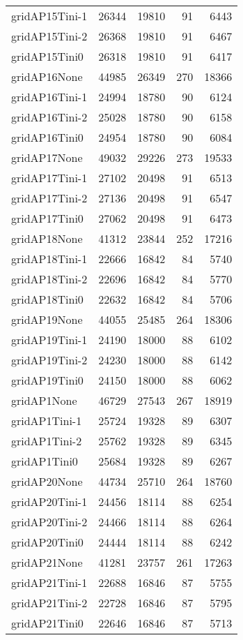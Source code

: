 \begin{longtable}{lrrrr}
gridAP15Tini-1 & 26344 & 19810 & 91 & 6443 \\
gridAP15Tini-2 & 26368 & 19810 & 91 & 6467 \\
gridAP15Tini0 & 26318 & 19810 & 91 & 6417 \\
gridAP16None & 44985 & 26349 & 270 & 18366 \\
gridAP16Tini-1 & 24994 & 18780 & 90 & 6124 \\
gridAP16Tini-2 & 25028 & 18780 & 90 & 6158 \\
gridAP16Tini0 & 24954 & 18780 & 90 & 6084 \\
gridAP17None & 49032 & 29226 & 273 & 19533 \\
gridAP17Tini-1 & 27102 & 20498 & 91 & 6513 \\
gridAP17Tini-2 & 27136 & 20498 & 91 & 6547 \\
gridAP17Tini0 & 27062 & 20498 & 91 & 6473 \\
gridAP18None & 41312 & 23844 & 252 & 17216 \\
gridAP18Tini-1 & 22666 & 16842 & 84 & 5740 \\
gridAP18Tini-2 & 22696 & 16842 & 84 & 5770 \\
gridAP18Tini0 & 22632 & 16842 & 84 & 5706 \\
gridAP19None & 44055 & 25485 & 264 & 18306 \\
gridAP19Tini-1 & 24190 & 18000 & 88 & 6102 \\
gridAP19Tini-2 & 24230 & 18000 & 88 & 6142 \\
gridAP19Tini0 & 24150 & 18000 & 88 & 6062 \\
gridAP1None & 46729 & 27543 & 267 & 18919 \\
gridAP1Tini-1 & 25724 & 19328 & 89 & 6307 \\
gridAP1Tini-2 & 25762 & 19328 & 89 & 6345 \\
gridAP1Tini0 & 25684 & 19328 & 89 & 6267 \\
gridAP20None & 44734 & 25710 & 264 & 18760 \\
gridAP20Tini-1 & 24456 & 18114 & 88 & 6254 \\
gridAP20Tini-2 & 24466 & 18114 & 88 & 6264 \\
gridAP20Tini0 & 24444 & 18114 & 88 & 6242 \\
gridAP21None & 41281 & 23757 & 261 & 17263 \\
gridAP21Tini-1 & 22688 & 16846 & 87 & 5755 \\
gridAP21Tini-2 & 22728 & 16846 & 87 & 5795 \\
gridAP21Tini0 & 22646 & 16846 & 87 & 5713 \\

\end{longtable}
